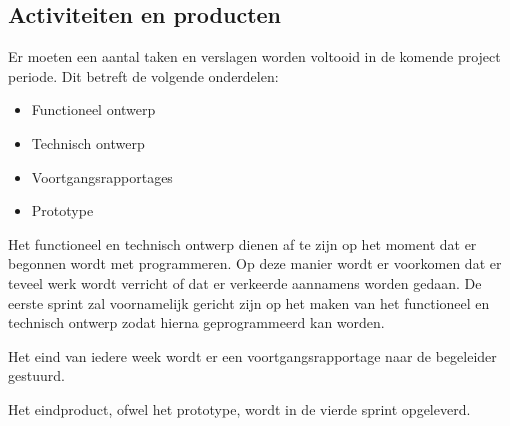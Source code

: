 \subsection{Activiteiten en producten}
Er moeten een aantal taken en verslagen worden voltooid in de komende
project periode. Dit betreft de volgende onderdelen:
\begin{itemize}
  	\item Functioneel ontwerp
  	\item Technisch ontwerp
    \item Voortgangsrapportages
	\item Prototype
\end{itemize}
Het functioneel en technisch ontwerp dienen af te zijn op het moment dat 
er begonnen wordt met programmeren. Op deze manier wordt er voorkomen 
dat er teveel werk wordt verricht of dat er verkeerde aannamens worden 
gedaan. De eerste sprint zal voornamelijk gericht zijn op het maken van 
het functioneel en technisch ontwerp zodat hierna geprogrammeerd kan
worden.

Het eind van iedere week wordt er een voortgangsrapportage naar de begeleider
gestuurd.

Het eindproduct, ofwel het prototype, wordt in de vierde sprint opgeleverd.
